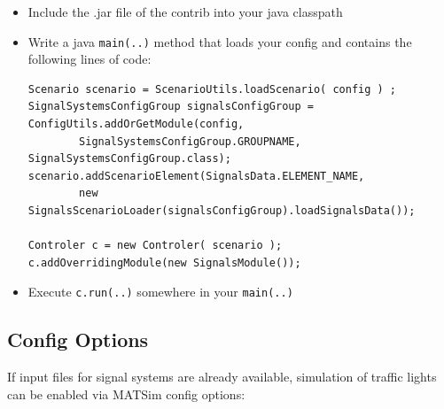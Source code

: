 \begin{itemize}
	\item Include the .jar file of the contrib into your java classpath
	\item Write a java \lstinline$main(..)$ method that loads your config and contains the following lines of code:
		\begin{lstlisting}
Scenario scenario = ScenarioUtils.loadScenario( config ) ;
SignalSystemsConfigGroup signalsConfigGroup = ConfigUtils.addOrGetModule(config, 
		SignalSystemsConfigGroup.GROUPNAME, SignalSystemsConfigGroup.class);
scenario.addScenarioElement(SignalsData.ELEMENT_NAME, 
		new SignalsScenarioLoader(signalsConfigGroup).loadSignalsData());

Controler c = new Controler( scenario );
c.addOverridingModule(new SignalsModule());
		\end{lstlisting}
	\item Execute \lstinline$c.run(..)$ somewhere in your \lstinline$main(..)$
\end{itemize}



\subsection{Config Options}

If input files for signal systems are already available, simulation of traffic lights can be enabled via MATSim config options:

